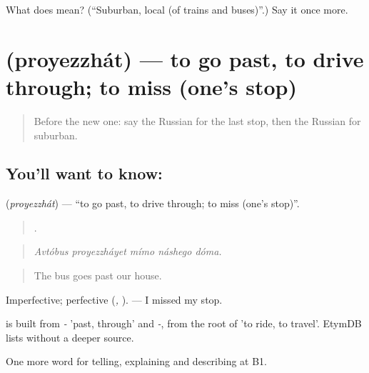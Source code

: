 \begin{tcolorbox}[breakable,colback=teal!4,colframe=teal!35!black,title={Before you move on}]
What does  mean? (\textquotedblleft{}Suburban, local (of trains and buses)\textquotedblright{}.) Say it once more.
\end{tcolorbox}
\section[\texorpdfstring{\ru{проезжать} (proyezzhát)}{проезжать (proyezzhát)}]{ (proyezzhát) — to go past, to drive through; to miss (one's stop)}

\label{lesson:RU-C418-proyezzhat}



\begin{quote}
Before the new one: say the Russian for the last stop, then the Russian for suburban.
\end{quote}

\subsection*{You'll want to know: }
\textbf{} (\emph{proyezzhát}) — \textquotedblleft{}to go past, to drive through; to miss (one's stop)\textquotedblright{}.

\begin{quote}
    .
\end{quote}

\begin{quote}
\emph{Avtóbus proyezzháyet mímo náshego dóma.}
\end{quote}

\begin{quote}
The bus goes past our house.
\end{quote}

Imperfective; perfective \emph{} (\emph{, }). \emph{   } — I missed my stop.

\begin{cousinweb}
\emph{} is built from \emph{-} 'past, through' and \emph{-}, from the root of \emph{} 'to ride, to travel'. EtymDB lists \emph{} without a deeper source.
\end{cousinweb}

\begin{grammarlens}[title={What you've built}]
One more word for telling, explaining and describing at B1.
\end{grammarlens}

